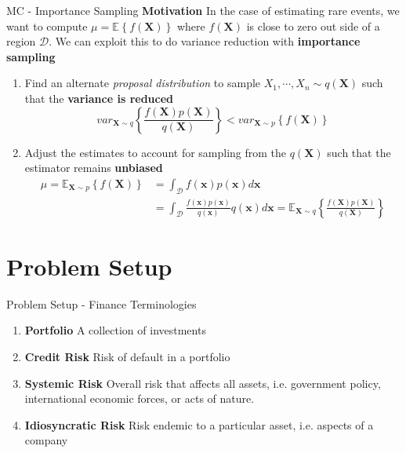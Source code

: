 \documentclass{beamer}
\newcommand{\matr}[1]{\mathbf{#1}}
\newcommand{\E}[2][]{\mathbb{E}_{#1}\left\{#2\right\}}
\newcommand{\var}[2][]{var_{#1}\left\{#2\right\}}
\newcommand{\bx}{\matr{x}}
\newcommand{\bX}{\matr{X}}
\begin{document}
\begin{frame}{MC - Importance Sampling}
\textbf{Motivation} In the case of estimating rare events, we want to compute $\mu = \E{f(\bX)}$ where $f(\bX)$ is close to zero out side of a region $\mathcal{D}$. We can exploit this to do variance reduction with \textbf{importance sampling}
\begin{enumerate}
    \item Find an alternate \textit{proposal distribution} to sample $X_1, \cdots, X_n \sim q(\bX)$ such that the \textbf{variance is reduced}
    \[
        \var[\bX \sim q]{\frac{f(\bX)p(\bX)}{q(\bX)}} < 
        \var[\bX \sim p]{f(\bX)}
    \]
    \item Adjust the estimates to account for sampling from the $q(\bX)$ such that the estimator remains \textbf{unbiased}
    \begin{align*}
    \mu = \E[\bX \sim p]{f(\bX)} 
    &= \int_{\mathcal{D}} f(\bx) p(\bx) d\bx \\
    &= \int_{\mathcal{D}} \frac{f(\bx)p(\bx)}{q(\bx)} q(\bx) d\bx 
    = \E[\bX \sim q]{\frac{f(\bX)p(\bX)}{q(\bX)}}
\end{align*}
\end{enumerate}
\end{frame}

\section{Problem Setup}
 
\begin{frame}{Problem Setup - Finance Terminologies}
\begin{enumerate}
    \item \textbf{Portfolio} A collection of investments
    \item \textbf{Credit Risk} Risk of default in a portfolio
    \item \textbf{Systemic Risk} Overall risk that affects all assets, i.e. government policy, international economic forces, or acts of nature.
    \item \textbf{Idiosyncratic Risk} Risk endemic to a particular asset, i.e. aspects of a company
\end{enumerate}
\end{frame}
\end{document}
